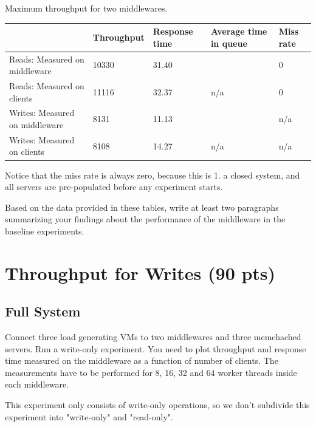 \documentclass[11pt,a4paper]{article}
\begin{document}
\begin{center}
	{Maximum throughput for two middlewares.}
	\begin{tabular}{|l|p{2cm}|p{2cm}|p{2cm}|p{2cm}|}
		\hline                                & Throughput & Response time & Average time in queue & Miss rate \\ 
		\hline Reads: Measured on middleware  & 10330 & 31.40 &                       &           0\\ 
		\hline Reads: Measured on clients     & 11116 &  32.37 & n/a                   &           0\\ 
		\hline Writes: Measured on middleware & 8131 & 11.13 &                       & n/a       \\ 
		\hline Writes: Measured on clients    & 8108 & 14.27 & n/a                   & n/a       \\ 
		\hline 
	\end{tabular}
\end{center}

Notice that the miss rate is always zero, because this is 1. a closed system, and all servers are pre-populated before any experiment starts.

Based on the data provided in these tables, write at least two paragraphs summarizing your findings about the performance of the middleware in the baseline experiments.

\section{Throughput for Writes (90 pts)}

\subsection{Full System}

Connect three load generating VMs to two middlewares and three memchached servers. Run a write-only experiment. 
You need to plot throughput and response time measured on the middleware as a function of number of clients. The measurements have to be performed for 8, 16, 32 and 64 worker threads inside each middleware.

This experiment only consists of write-only operations, so we don't subdivide this experiment into "write-only" and "read-only".
\end{document}
